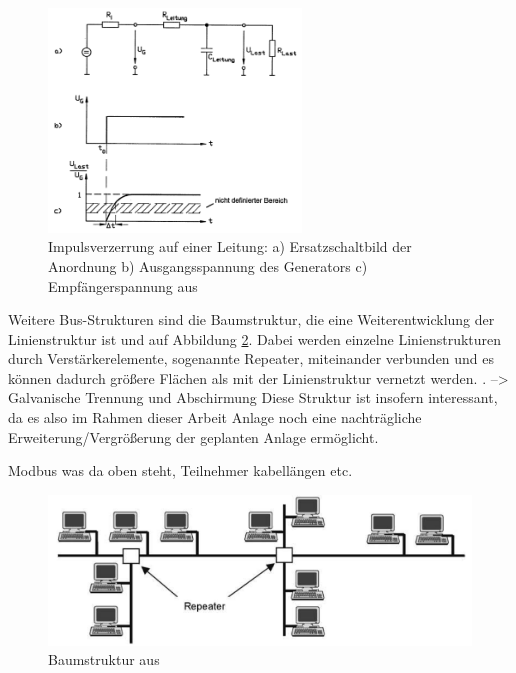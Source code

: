 \begin{figure}
\centering
\includegraphics[width=0.6\textwidth]{abbildungen/20160110_impulsbus}
\caption[Impulsverzerrung auf einer Leitung]{Impulsverzerrung auf einer Leitung: a) Ersatzschaltbild der Anordnung b) Ausgangsspannung des Generators c) Empfängerspannung aus \cite[S.~4]{schn06}}
\label{fig:bus_impuls}
\end{figure}

Weitere Bus-Strukturen sind die Baumstruktur, die eine Weiterentwicklung der Linienstruktur ist und auf Abbildung \ref{fig:baum_struktur}. Dabei werden einzelne Linienstrukturen durch Verstärkerelemente, sogenannte  Repeater, miteinander verbunden und es können dadurch größere Flächen als mit der Linienstruktur vernetzt werden. \cite[S.5~f.]{schn06}.
--> Galvanische Trennung und Abschirmung 
Diese Struktur ist insofern interessant, da es also im Rahmen dieser Arbeit Anlage noch eine nachträgliche Erweiterung/Vergrößerung der geplanten Anlage ermöglicht.

Modbus was da oben steht, Teilnehmer kabellängen etc.

\begin{figure}
\centering
\includegraphics[width=\textwidth]{abbildungen/20160110_baumstruktur}
\caption[Baumstruktur]{Baumstruktur aus \cite[S.~5]{schn06}}
\label{fig:baum_struktur}
\end{figure}

